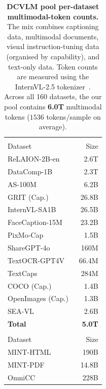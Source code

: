 \begin{table}[!h]
\centering
\caption{\textbf{DCVLM pool per-dataset multimodal-token counts.} The mix combines \colorbox{capcolor}{captioning data}, \colorbox{mmdoccolor}{multimodal documents}, \colorbox{instructcolor}{visual instruction-tuning data} (organised by capability), and \colorbox{textcolor}{text-only data}. Token counts are measured using the InternVL-2.5 tokenizer~\citep{chen2024expanding}. Across all 160 datasets, the our pool contains \textbf{6.0T} multimodal tokens (${1536}$ tokens/sample on average).}
\label{tab:dcvlm-datamix-tokens}
\scriptsize
\setlength{\tabcolsep}{1.2pt}
\renewcommand{\arraystretch}{1.05}
\begin{minipage}[t]{0.245\textwidth}
\centering
\begin{tabular}{lr}
\toprule
\rowcolor{capcolor}\multicolumn{2}{l}{\textit{Captioning}} \\
Dataset & Size \\
\midrule
ReLAION-2B-en~\cite{schuhmann2022laion} & 2.6T \\
DataComp-1B~\cite{gadre2023datacomp} & 2.3T \\
AS-100M~\cite{wang2024allseeing} & 6.2B \\
GRIT (Cap.)~\cite{peng2023kosmos2} & 26.8B \\
InternVL-SA1B~\cite{chen2024internvl} & 26.5B \\
FaceCaption-15M~\cite{dai2024facecaption} & 23.2B \\
PixMo-Cap~\cite{deitke2025molmo} & 1.5B \\
ShareGPT-4o~\cite{chen2024sharegpt4v} & 160M \\
TextOCR-GPT4V~\cite{carter2024textocrgpt4v} & 66.4M \\
TextCaps~\cite{sidorov2020textcaps} & 284M \\
COCO (Cap.)~\cite{chen2015cococaptions} & 1.4B \\
OpenImages (Cap.)~\cite{kuznetsova2020openimages} & 1.3B \\
SEA-VL~\cite{cahyawijaya2025seavl} & 2.6B \\
\midrule
\textbf{Total} & \textbf{5.0T} \\
\midrule
\rowcolor{mmdoccolor}\multicolumn{2}{l}{\textit{Multimodal Docs}} \\
Dataset & Size \\
\midrule
MINT-HTML~\cite{awadalla2024mint} & 190B \\
MINT-PDF~\cite{awadalla2024mint} & 14.8B \\
OmniCC~\cite{li2024omnicorpus} & 228B \\

\end{tabular}
\end{minipage}
\end{table}
